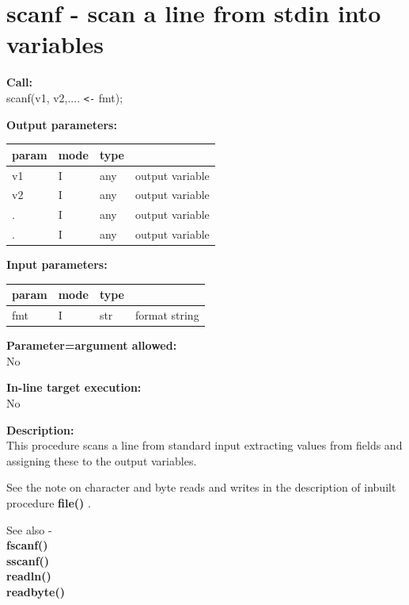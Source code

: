     \section{scanf - scan a line from stdin into variables}\label{sec:ipscanf}

        {\bf Call:} \\
        scanf(v1, v2,.... \verb'<-' fmt);
        
        {\bf Output parameters:} \\
        \begin{tabular}{| l | l | l | l |}
        \hline
        param  & mode     & type  & \\
        \hline \hline
        v1 & I & any & output variable  \\ \hline
        v2 & I & any & output variable  \\ \hline
        .  & I & any & output variable  \\ \hline
        .  & I & any & output variable  \\ \hline
        \end{tabular}
        
        {\bf Input parameters:} \\
        \begin{tabular}{| l | l | l | l |}
        \hline
        param  & mode     & type  & \\
        \hline \hline
        fmt  & I & str & format string      \\ \hline
        \end{tabular}
        
        {\bf Parameter=argument allowed:} \\
        No
        
        {\bf In-line target execution:} \\
        No
        
        {\bf Description:} \\
        This procedure scans a line from standard input extracting values from fields
        and assigning these to the output variables.
        
        
          
        See the note on character and byte reads and writes in the description
        of inbuilt procedure {\bf file()} .
     
        See also - \\
        {\bf fscanf()}  \\
        {\bf sscanf()}  \\
        {\bf readln()}  \\
        {\bf readbyte()} 




